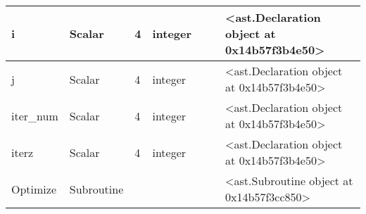 \documentclass{report}
\begin{document}
\begin{center}
\begin{longtable}{|p{3.5cm}|p{1.5cm}|p{1.5cm}|p{1.5cm}|p{1cm}|p{2cm}|p{4cm}| }
i & Scalar & 4 & integer &  &  & <ast.Declaration object at 0x14b57f3b4e50> \\\hline

j & Scalar & 4 & integer &  &  & <ast.Declaration object at 0x14b57f3b4e50> \\\hline

iter\_num & Scalar & 4 & integer &  &  & <ast.Declaration object at 0x14b57f3b4e50> \\\hline

iterz & Scalar & 4 & integer &  &  & <ast.Declaration object at 0x14b57f3b4e50> \\\hline

Optimize & Subroutine &  &  &  &  & <ast.Subroutine object at 0x14b57f3cc850> \\\hline

\end{longtable}
\end{center}

 \vspace{1cm}
\end{document}
